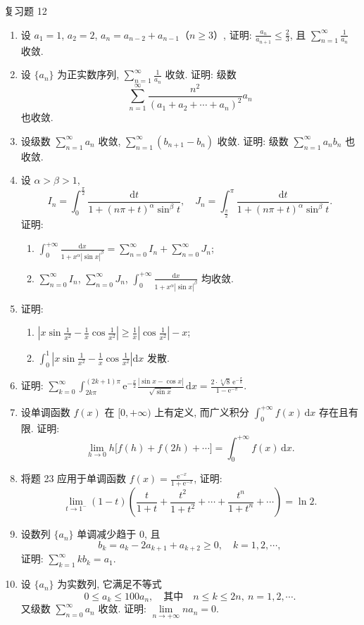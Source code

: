 \begin{exblock}{复习题 12}
\begin{enumerate}
\begin{enumerate}
  \end{enumerate}
  \item 设 $a_{1}=1$, $a_{2}=2$, $a_{n}=a_{n-2}+a_{n-1}$（$n\geqslant3$）, 证明: $\frac{a_{n}}{a_{n+1}}\leqslant\frac{2}{3}$, 且 $\sum_{n=1}^{\infty}\frac{1}{a_{n}}$ 收敛.
  \item 设 $\{a_{n}\}$ 为正实数序列, $\sum_{n=1}^{\infty}\frac{1}{a_{n}}$ 收敛. 证明: 级数
  \[
    \sum_{n=1}^{\infty}\frac{n^{2}}{(a_{1}+a_{2}+\cdots+a_{n})^{2}}a_{n}
\]
  也收敛.
  \item 设级数 $\sum_{n=1}^{\infty}a_{n}$ 收敛, $\sum_{n=1}^{\infty}(b_{n+1}-b_{n})$ 收敛. 证明: 级数 $\sum_{n=1}^{\infty}a_{n}b_{n}$ 也收敛.
  \item 设 $\alpha>\beta>1$,
  \[
    I_{n}=\int_{0}^{\frac{\pi}{2}}\frac{\mathrm{d}t}{1+(n\pi+t)^{\alpha}\sin^{\beta}t},\quad
    J_{n}=\int_{\frac{\pi}{2}}^{\pi}\frac{\mathrm{d}t}{1+(n\pi+t)^{\alpha}\sin^{\beta}t}.
\]
  证明:
  \begin{enumerate}
    \item $\displaystyle\int_{0}^{+\infty}\frac{\mathrm{d}x}{1+x^{\alpha}|\sin x|^{\beta}}=\sum_{n=0}^{\infty}I_{n}+\sum_{n=0}^{\infty}J_{n}$;
    \item $\displaystyle\sum_{n=0}^{\infty}I_{n}$, $\sum_{n=0}^{\infty}J_{n}$, $\displaystyle\int_{0}^{+\infty}\frac{\mathrm{d}x}{1+x^{\alpha}|\sin x|^{\beta}}$ 均收敛.
  \end{enumerate}
  \item 证明:
  \begin{enumerate}
    \item $\displaystyle\left|x\sin\frac{1}{x^{2}}-\frac{1}{x}\cos\frac{1}{x^{2}}\right|\geqslant\frac{1}{x}\left|\cos\frac{1}{x^{2}}\right|-x$;
    \item $\displaystyle\int_{0}^{1}\left|x\sin\frac{1}{x^{2}}-\frac{1}{x}\cos\frac{1}{x^{2}}\right|\mathrm{d}x$ 发散.
  \end{enumerate}
  \item 证明: $\displaystyle\sum_{k=0}^{\infty}\int_{2k\pi}^{(2k+1)\pi}\mathrm{e}^{-\frac{x}{2}}\frac{|\sin x-\cos x|}{\sqrt{\sin x}}\,\mathrm{d}x=\frac{2\cdot\sqrt[4]{8}\,\mathrm{e}^{-\frac{\pi}{8}}}{1-\mathrm{e}^{-\pi}}$.
  \item 设单调函数 $f(x)$ 在 $[0,+\infty)$ 上有定义, 而广义积分 $\int_{0}^{+\infty}f(x)\,\mathrm{d}x$ 存在且有限. 证明:
  \[
    \lim_{h\to0}h\bigl[f(h)+f(2h)+\cdots\bigr]=\int_{0}^{+\infty}f(x)\,\mathrm{d}x.
\]
  \item 将题 23 应用于单调函数 $f(x)=\frac{\mathrm{e}^{-x}}{1+\mathrm{e}^{-x}}$, 证明:
  \[
    \lim_{t\to1^{-}}(1-t)\left(\frac{t}{1+t}+\frac{t^{2}}{1+t^{2}}+\cdots+\frac{t^{n}}{1+t^{n}}+\cdots\right)=\ln2.
\]
  \item 设数列 $\{a_{n}\}$ 单调减少趋于 $0$, 且
  \[
    b_{k}=a_{k}-2a_{k+1}+a_{k+2}\geqslant0,\quad k=1,2,\cdots,
\]
  证明: $\sum_{k=1}^{\infty}kb_{k}=a_{1}$.
  \item 设 $\{a_{n}\}$ 为实数列, 它满足不等式
  \[
    0\leqslant a_{k}\leqslant100a_{n},\quad\text{其中}\quad n\leqslant k\leqslant2n,\ n=1,2,\cdots.
\]
  又级数 $\sum_{n=0}^{\infty}a_{n}$ 收敛. 证明: $\lim\limits_{n\to+\infty}na_{n}=0$.
\end{enumerate}
\end{exblock}
